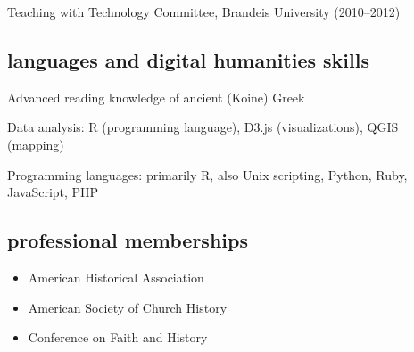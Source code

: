 \documentclass[11pt]{article}
\providecommand{\tightlist}{%
  \setlength{\itemsep}{0pt}\setlength{\parskip}{0pt}}
\begin{document}
Teaching with Technology Committee, Brandeis University (2010--2012)


\subsection{languages and digital humanities
  skills}\label{languages-and-digital-humanities-skills}

Advanced reading knowledge of ancient (Koine) Greek

Data analysis: R (programming language), D3.js (visualizations), QGIS
(mapping)

Programming languages: primarily R, also Unix scripting, Python, Ruby, 
JavaScript, PHP

\subsection{professional memberships}\label{professional-memberships}

\begin{itemize}
    \tightlist
  \item
    American Historical Association
  \item
    American Society of Church History
  \item
    Conference on Faith and History
\end{itemize}
\end{document}
